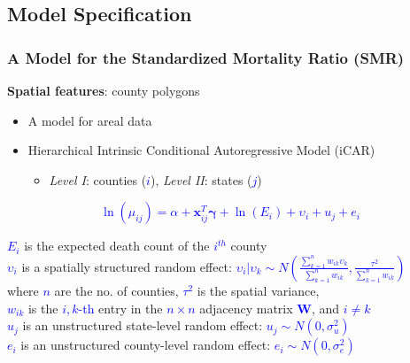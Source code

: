 \documentclass{beamer}
\begin{document}
\subsection{Model Specification}
    \begin{frame}
	\frametitle{A Model for the Standardized Mortality Ratio (SMR)}
	
	\textbf{Spatial features}: county polygons
	\begin{itemize}
		\item A model for areal data
		\item Hierarchical Intrinsic Conditional Autoregressive Model (iCAR) 
		\begin{itemize}
			\item \textit{Level I}: counties (\textcolor{blue}{$i$}), \textit{Level II}: states (\textcolor{blue}{$j$})
		\end{itemize}
	\end{itemize}
	\centering
	\begin{tcolorbox}[width = 7.2cm, colframe = red!75!black, title = \scriptsize{Model Specified}, height = 1.5cm, valign=center, halign=center, halign title = center]
		\textcolor{blue}{$$\ln(\mu_{ij})=\alpha+\mathbf{x}_{ij}^T\boldsymbol{\gamma}+\ln(E_{i})+\upsilon_{i}+u_{j}+e_{i}$$}
	\end{tcolorbox}
	
	\scriptsize{ \textcolor{blue}{$E_i$} is the expected death count of the  \textcolor{blue}{$i^{th}$} county}\\
	   \scriptsize{  \textcolor{blue}{$\upsilon_{i}$} is a spatially structured random effect:  \textcolor{blue}{$\upsilon_{i}|\upsilon_{k}\sim N(\frac{\sum_{k=1}^{n}{w_{ik}\upsilon_k}}{\sum_{k=1}^{n}{w_{ik}}}, \frac{\tau^2}{\sum_{k=1}^{n}{w_{ik}}})$}} \\
	       \tiny{where  \textcolor{blue}{$n$} are the no. of counties,  \textcolor{blue}{$\tau^2$} is the spatial variance,\\ \textcolor{blue}{$w_{ik}$} is the \textcolor{blue}{$i,k$-th} entry in the \textcolor{blue}{$n \times n$} adjacency matrix \textcolor{blue}{$\mathbf{W}$}, and  \textcolor{blue}{$i\neq k$}}\\
	       
	                    \scriptsize{  \textcolor{blue}{$u_{j}$} is an unstructured state-level random effect:  \textcolor{blue}{$u_{j} \sim N(0,\sigma^2_u)$}}\\
	       \vspace{0.2cm}
	       \scriptsize{  \textcolor{blue}{$e_{i}$} is an unstructured county-level random effect:  \textcolor{blue}{$e_{i} \sim N(0,\sigma^2_e)$}}

	\end{frame}
	
\end{document}
